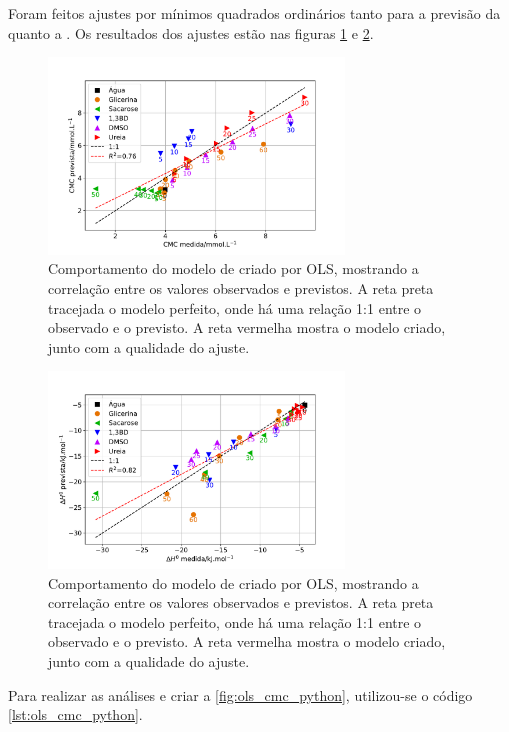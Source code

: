 		Foram feitos ajustes por mínimos quadrados ordinários tanto para a previsão da \cmc{} quanto a \DHmic. Os resultados dos ajustes estão nas figuras \ref{fig:ols_cmc_python} e \ref{fig:ols_dh_python}.
		
		\begin{figure}[h]
			\centering
			\includegraphics[width=0.7\textwidth]{imagens/itc/ols_cmc_python}
			\caption{Comportamento do modelo de \cmc{} criado por OLS, mostrando a correlação entre os valores observados e previstos. A reta preta tracejada o modelo perfeito, onde há uma relação 1:1 entre o observado e o previsto. A reta vermelha mostra o modelo criado, junto com a qualidade do ajuste.}
			\label{fig:ols_cmc_python}
		\end{figure}
		
		\begin{figure}[h]
			\centering
			\includegraphics[width=0.7\textwidth]{imagens/itc/ols_dh_python}
			\caption{Comportamento do modelo de \DHmic{} criado por OLS, mostrando a correlação entre os valores observados e previstos. A reta preta tracejada o modelo perfeito, onde há uma relação 1:1 entre o observado e o previsto. A reta vermelha mostra o modelo criado, junto com a qualidade do ajuste.}
			\label{fig:ols_dh_python}
		\end{figure}

		Para realizar as análises e criar a \autoref{fig:ols_cmc_python}, utilizou-se o código \ref{lst:ols_cmc_python}.
		

